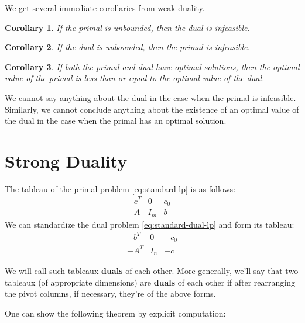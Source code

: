 \documentclass[
]{book}
\newtheorem{corollary}{Corollary}[chapter]
\theoremstyle{definition}
\theoremstyle{definition}
\theoremstyle{definition}
\theoremstyle{definition}
\theoremstyle{remark}
\begin{document}
We get several immediate corollaries from weak duality.

\begin{corollary}
If the primal is unbounded, then the dual is infeasible.
\end{corollary}

\begin{corollary}
If the dual is unbounded, then the primal is infeasible.
\end{corollary}

\begin{corollary}
If both the primal and dual have optimal solutions, then the optimal value of the primal is less than or equal to the optimal value of the dual.
\end{corollary}

We cannot say anything about the dual in the case when the primal is infeasible. Similarly, we cannot conclude anything about the existence of an optimal value of the dual in the case when the primal has an optimal solution.

\hypertarget{strong-duality}{%
\section{Strong Duality}\label{strong-duality}}

The tableau of the primal problem \eqref{eq:standard-lp} is as follows:
\begin{equation} 
  \begin{array}{ll|r}
  c^T & 0 & c_0 \\ \hline
  A & I_m & b 
  \end{array}
  \label{eq:tableau-primal}
\end{equation}
We can standardize the dual problem \eqref{eq:standard-dual-lp} and form its tableau:
\begin{equation} 
  \begin{array}{ll|r}
  -b^T & 0 & -c_0 \\ \hline
  -A^T & I_n & -c 
  \end{array}
  \label{eq:tableau-dual}
\end{equation}

We will call such tableaux \textbf{duals} of each other. More generally, we'll say that two tableaux (of appropriate dimensions) are \textbf{duals} of each other if after rearranging the pivot columns, if necessary, they're of the above forms.

One can show the following theorem by explicit computation:
\end{document}
